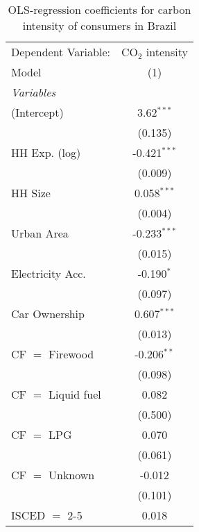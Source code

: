 
\begin{table}[htbp!]
   \centering
   \small
   \begin{adjustbox}{width = 1\textwidth, max height = 0.95\textheight, center}
      \begin{threeparttable}[b]
         \caption{\label{tab:OLS_1_BRA} OLS-regression coefficients for carbon intensity of consumers in Brazil}
         \begin{tabular}{lc}
            \tabularnewline \midrule \midrule
            Dependent Variable: & CO$_{2}$ intensity\\  
            Model               & (1)\\  
            \midrule
            \emph{Variables}\\
            (Intercept)         & 3.62$^{***}$\\   
                                & (0.135)\\   
            HH Exp. (log)       & -0.421$^{***}$\\   
                                & (0.009)\\   
            HH Size             & 0.058$^{***}$\\   
                                & (0.004)\\   
            Urban Area          & -0.233$^{***}$\\   
                                & (0.015)\\   
            Electricity Acc.    & -0.190$^{*}$\\   
                                & (0.097)\\   
            Car Ownership       & 0.607$^{***}$\\   
                                & (0.013)\\   
            CF $=$ Firewood     & -0.206$^{**}$\\   
                                & (0.098)\\   
            CF $=$ Liquid fuel  & 0.082\\   
                                & (0.500)\\   
            CF $=$ LPG          & 0.070\\   
                                & (0.061)\\   
            CF $=$ Unknown      & -0.012\\   
                                & (0.101)\\   
            ISCED $=$ 2-5       & 0.018\\   

\end{tabular}
\end{threeparttable}
\end{adjustbox}
\end{table}
